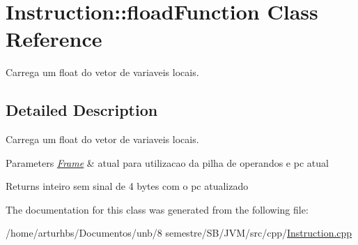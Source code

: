\hypertarget{classInstruction_1_1floadFunction}{}\section{Instruction\+:\+:fload\+Function Class Reference}
\label{classInstruction_1_1floadFunction}


Carrega um float do vetor de variaveis locais.  




\subsection{Detailed Description}
Carrega um float do vetor de variaveis locais. 


\begin{DoxyParams}{Parameters}
{\em \hyperlink{classFrame}{Frame}} & atual para utilizacao da pilha de operandos e pc atual \\
\hline
\end{DoxyParams}
\begin{DoxyReturn}{Returns}
inteiro sem sinal de 4 bytes com o pc atualizado 
\end{DoxyReturn}


The documentation for this class was generated from the following file\+:\begin{DoxyCompactItemize}
\item 
/home/arturhbs/\+Documentos/unb/8 semestre/\+S\+B/\+J\+V\+M/src/cpp/\hyperlink{Instruction_8cpp}{Instruction.\+cpp}\end{DoxyCompactItemize}
